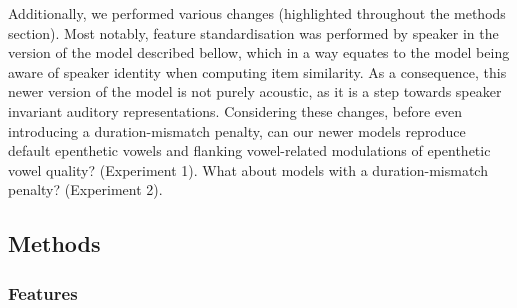 Additionally, we performed various changes (highlighted throughout the methods section). Most notably, feature standardisation was performed by speaker in the version of the model described bellow, which in a way equates to the model being aware of speaker identity when computing item similarity. As a consequence, this newer version of the model is not purely acoustic, as it is a step towards speaker invariant auditory representations. Considering these changes, before even introducing a duration-mismatch penalty, can our newer models reproduce default epenthetic vowels and flanking vowel-related modulations of epenthetic vowel quality? (Experiment 1). What about models with a duration-mismatch penalty? (Experiment 2).    

\subsection{Methods}
\subsubsection{Features}



